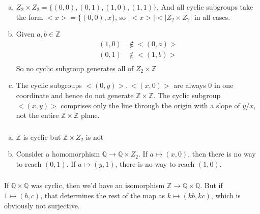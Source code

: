 \documentclass{article}
\newcommand{\ints}{\mathbb{Z}}
\newcommand{\rats}{\mathbb{Q}}
\newcommand{\set}[1]{ \{ #1 \} }
\newcommand{\norm}[1]{|#1|}
\newcommand{\cyclic}[1]{<#1>}
\begin{document}
\subsubsection{}\label{ex3p12}
\begin{enumerate}[(a)]
\item $Z_2\times Z_2 = \set{(0,0), (0,1), (1,0), (1,1)}$,
And all cyclic subgroups take the form $\cyclic{x}=\set{(0,0), x}$, so $\norm{\cyclic{x}} < \norm{Z_2\times Z_2}$ in all cases.\\
\item Given $a,b \in \ints$
\begin{align*}
(1,0) &\notin \cyclic{(0,a)}\\
(0,1) &\notin \cyclic{(1,b)}\\
\end{align*}
So no cyclic subgroup generates all of $Z_2 \times \ints$
\item The cyclic subgroups $\cyclic{(0,y)}, \cyclic{(x,0)}$ are always $0$ in one coordinate and hence do not generate $\ints\times\ints$. The cyclic subgroup $\cyclic{(x,y)}$ comprises only the line through the origin with a slope of $y/x$, not the entire $\ints\times\ints$ plane.
\end{enumerate}
\subsubsection{}\label{ex3p13}
\begin{enumerate}[(a)]
\item $\ints$ is cyclic but $\ints\times Z_2$ is not
\item Consider a homomorphism $\rats \to \rats\times Z_2$. If $a \mapsto (x,0)$, then there is no way to reach $(0,1)$. If $a \mapsto (y,1)$, there is no way to reach $(1,0)$. 
\end{enumerate}
\subsubsection{}\label{ex3p14}
\subsubsection{}\label{ex3p15}
If $\rats\times\rats$ was cyclic, then we'd have an isomorphism $\ints \to \rats\times\rats$. But if $1 \mapsto (b,c)$, that determines the rest of the map as $k \mapsto (kb,kc)$, which is obviously not surjective.
\end{document}
